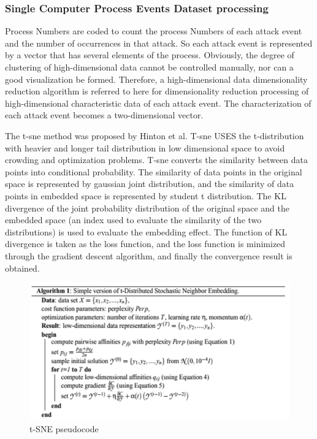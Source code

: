\documentclass[12pt,journal,draftcls,doublespace, letterpaper,onecolumn]{IEEEtran}
\begin{document}
\subsubsection{Single Computer Process Events Dataset processing}

Process Numbers are coded to count the process Numbers of each attack event and the number of occurrences in that attack. So each attack event is represented by a vector that has several elements of the process. Obviously, the degree of clustering of high-dimensional data cannot be controlled manually, nor can a good visualization be formed. Therefore, a high-dimensional data dimensionality reduction algorithm is referred to here for dimensionality reduction processing of high-dimensional characteristic data of each attack event. The characterization of each attack event becomes a two-dimensional vector.

The t-sne method was proposed by Hinton et al. T-sne USES the t-distribution with heavier and longer tail distribution in low dimensional space to avoid crowding and optimization problems. T-sne converts the similarity between data points into conditional probability. The similarity of data points in the original space is represented by gaussian joint distribution, and the similarity of data points in embedded space is represented by student t distribution. The KL divergence of the joint probability distribution of the original space and the embedded space (an index used to evaluate the similarity of the two distributions) is used to evaluate the embedding effect. The function of KL divergence is taken as the loss function, and the loss function is minimized through the gradient descent algorithm, and finally the convergence result is obtained.

\begin{figure}[htpb]
	\centering
	\includegraphics [width=1\textwidth]{7.png}
	\caption{t-SNE pseudocode}
	\label{fig}
\end{figure}
\end{document}
